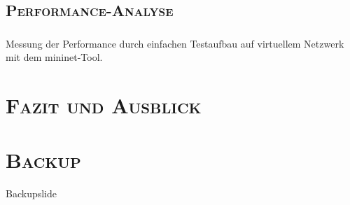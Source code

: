 \documentclass[xcolor=x11names,compress]{beamer}
\renewcommand{\(}{\begin{columns}}
\renewcommand{\)}{\end{columns}}
\newcommand{\<}[1]{\begin{column}{#1}}
\renewcommand{\>}{\end{column}}
\begin{document}
\subsection{\scshape Performance-Analyse}
\begin{frame}
  \frametitle{\insertsubsection}
  Messung der Performance durch einfachen Testaufbau auf virtuellem Netzwerk mit dem \textsf{mininet}-Tool.
\end{frame}

\section{\scshape Fazit und Ausblick}
\begin{frame}
\end{frame}

\appendix
\section{\scshape Backup}
\begin{frame}[noframenumbering]
Backupslide
\end{frame}
\end{document}
